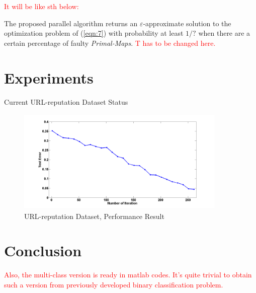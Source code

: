 \documentclass{llncs}
\newcommand{\comment}{\textcolor{red}}
\begin{document}
    \comment{It will be like sth below:}
	
	\begin{theorem}
	The proposed parallel algorithm returns an $\varepsilon$-approximate solution to the optimization problem of (\ref{eqn:7}) with probability at least $1/?$ when there are a certain percentage of faulty \textit{Primal-Maps}. \comment{T has to be changed here.}
	\end{theorem}
	
\section{Experiments} \label{sec:experiment}

Current URL-reputation Dataset Status

\begin{figure}[tb] \label{fig:01}
\center \includegraphics[height=5cm,width=10cm]{show1.png}
\caption{URL-reputation Dataset, Performance Result}
\end{figure}

\section{Conclusion} \label{sec:concl}

\comment{Also, the multi-class version is ready in matlab codes. It's quite trivial to obtain such a version from previously developed binary classification problem.}

\begin{small}


\end{small}
\end{document}
